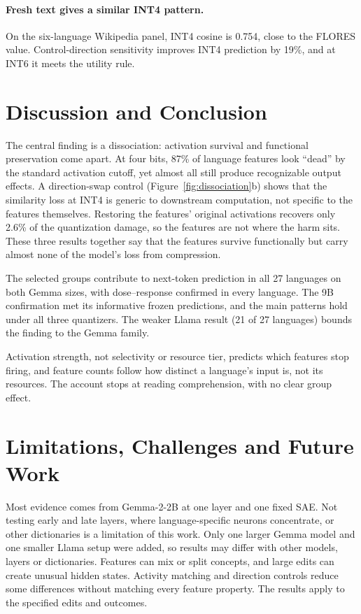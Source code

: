 \documentclass[11pt]{article}
\begin{document}
\paragraph{Fresh text gives a similar INT4 pattern.}
On the six-language Wikipedia panel, INT4 cosine is 0.754, close to the FLORES value. Control-direction sensitivity improves INT4 prediction by 19\%, and at INT6 it meets the utility rule.

\section{Discussion and Conclusion}
The central finding is a dissociation: activation survival and functional preservation come apart. At four bits, 87\% of language features look ``dead'' by the standard activation cutoff, yet almost all still produce recognizable output effects. A direction-swap control (Figure~\ref{fig:dissociation}b) shows that the similarity loss at INT4 is generic to downstream computation, not specific to the features themselves. Restoring the features' original activations recovers only 2.6\% of the quantization damage, so the features are not where the harm sits. These three results together say that the features survive functionally but carry almost none of the model's loss from compression.

The selected groups contribute to next-token prediction in all 27 languages on both Gemma sizes, with dose--response confirmed in every language. The 9B confirmation met its informative frozen predictions, and the main patterns hold under all three quantizers. The weaker Llama result (21 of 27 languages) bounds the finding to the Gemma family.

Activation strength, not selectivity or resource tier, predicts which features stop firing, and feature counts follow how distinct a language's input is, not its resources. The account stops at reading comprehension, with no clear group effect.

\section*{Limitations, Challenges and Future Work}
Most evidence comes from Gemma-2-2B at one layer and one fixed SAE. Not testing early and late layers, where language-specific neurons concentrate, or other dictionaries is a limitation of this work. Only one larger Gemma model and one smaller Llama setup were added, so results may differ with other models, layers or dictionaries. Features can mix or split concepts, and large edits can create unusual hidden states. Activity matching and direction controls reduce some differences without matching every feature property. The results apply to the specified edits and outcomes.
\end{document}
